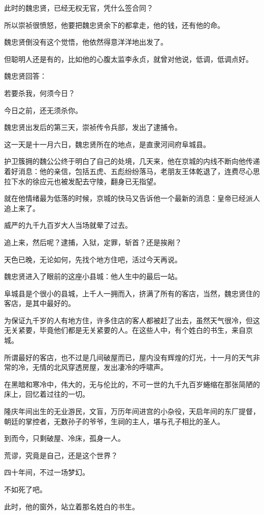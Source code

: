 \begin{multicols}{\theparacolNo}
此时的魏忠贤，已经无权无官，凭什么签合同？

所以崇祯很愤怒，他要把魏忠贤余下的都拿走，他的钱，还有他的命。

魏忠贤倒没有这个觉悟，他依然得意洋洋地出发了。

但聪明人还是有的，比如他的心腹太监李永贞，就曾对他说，低调，低调点好。

魏忠贤回答：

若要杀我，何须今日？

今日之前，还无须杀你。

魏忠贤出发后的第三天，崇祯传令兵部，发出了逮捕令。

这一天是十一月六日，魏忠贤所在的地点，是直隶河间府阜城县。

护卫簇拥的魏公公终于明白了自己的处境，几天来，他在京城的内线不断向他传递着好消息：他的亲信，包括五虎、五彪纷纷落马，老朋友王体乾退了，连费尽心思拉下水的徐应元也被发配去守陵，翻身已无指望。

就在他情绪最为低落的时候，京城的快马又告诉他一个最新的消息：皇帝已经派人追上来了。

威严的九千九百岁大人当场就晕了过去。

追上来，然后呢？逮捕，入狱，定罪，斩首？还是挨剐？

天色已晚，无论如何，先找个地方住吧，活过今天再说。

魏忠贤进入了眼前的这座小县城：他人生中的最后一站。

阜城县是个很小的县城，上千人一拥而入，挤满了所有的客店，当然，魏忠贤住的客店，是其中最好的。

为保证九千岁的人有地方住，许多住店的客人都被赶了出去，虽然天气很冷，但这无关紧要，毕竟他们都是无关紧要的人。在这些人中，有个姓白的书生，来自京城。

所谓最好的客店，也不过是几间破屋而已，屋内没有辉煌的灯光，十一月的天气非常的冷，无情的北风穿透房屋，发出凄冷的呼啸声。

在黑暗和寒冷中，伟大的，无与伦比的，不可一世的九千九百岁蜷缩在那张简陋的床上，回忆着过往的一切。

隆庆年间出生的无业游民，文盲，万历年间进宫的小杂役，天启年间的东厂提督，朝廷的掌控者，无数孙子的爷爷，生祠的主人，堪与孔子相比的圣人。

到而今，只剩破屋、冷床，孤身一人。

荒谬，究竟是自己，还是这个世界？

四十年间，不过一场梦幻。

不如死了吧。

此时，他的窗外，站立着那名姓白的书生。


\end{multicols}
